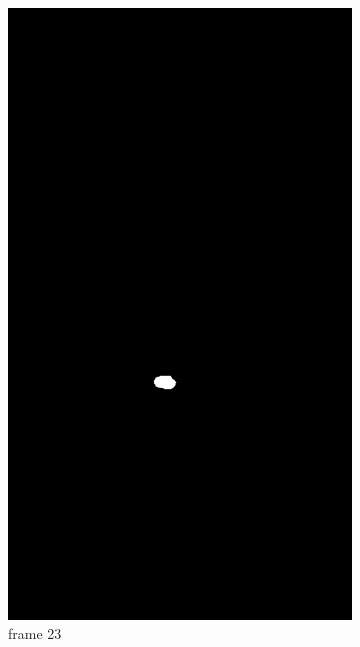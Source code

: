 \documentclass[12pt,a4paper]{article}
\begin{document}
\begin{figure}[htb]
\begin{subfigure}[h!]{0.3\textwidth}
		\includegraphics[width=\textwidth]{7296/22.png}
		\caption{frame 23}
	\end{subfigure}
	\begin{subfigure}[h!]{0.3\textwidth}
		\centering

\end{subfigure}
\end{figure}
\end{document}
